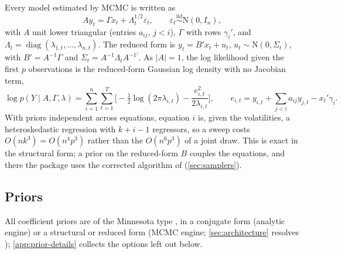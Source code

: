 Every model estimated by MCMC is written as
\begin{equation}\label{eq:structural}
  A y_t = \Gamma x_t + \Lambda_t^{1/2}\varepsilon_t, \qquad
  \varepsilon_t \overset{\mathrm{iid}}{\sim} \mathrm{N}(0, I_n),
\end{equation}
with $A$ unit lower triangular (entries $a_{ij}$, $j < i$), $\Gamma$ with rows $\gamma_i'$, and
$\Lambda_t = \operatorname{diag}(\lambda_{1,t},\dots,\lambda_{n,t})$. The reduced form is
$y_t = B'x_t + u_t$, $u_t \sim \mathrm{N}(0, \Sigma_t)$, with $B' = A^{-1}\Gamma$ and
$\Sigma_t = A^{-1}\Lambda_t A^{-1\prime}$. As $|A| = 1$, the log likelihood given the first $p$
observations is the reduced-form Gaussian log density with no Jacobian term,
\begin{equation}\label{eq:loglik}
  \log p(Y \mid A, \Gamma, \lambda)
    = \sum_{i=1}^{n}\sum_{t=1}^{T}\Big[-\tfrac12\log(2\pi\lambda_{i,t})
       - \frac{e_{i,t}^2}{2\lambda_{i,t}}\Big], \qquad
  e_{i,t} = y_{i,t} + {\textstyle\sum_{j<i}} a_{ij} y_{j,t} - x_t'\gamma_i .
\end{equation}
With priors independent across equations, equation $i$ is, given the volatilities, a
heteroskedastic regression with $k + i - 1$ regressors, so a sweep costs $O(nk^3) = O(n^4p^3)$
rather than the $O(n^6p^3)$ of a joint draw. %
This is exact in the structural form; a prior on the reduced-form $B$ couples the equations, and
there the package uses the corrected algorithm of \citet{carriero2022corrigendum}
(\cref{sec:samplers}). %

\subsection{Priors}\label{sec:framework:priors}

All coefficient priors are of the Minnesota type \citep{litterman1986forecasting}, in a conjugate
form (analytic engine) or a structural or reduced form (MCMC engine; \cref{sec:architecture}
resolves ); \cref{app:prior-details} collects the options left out below.

